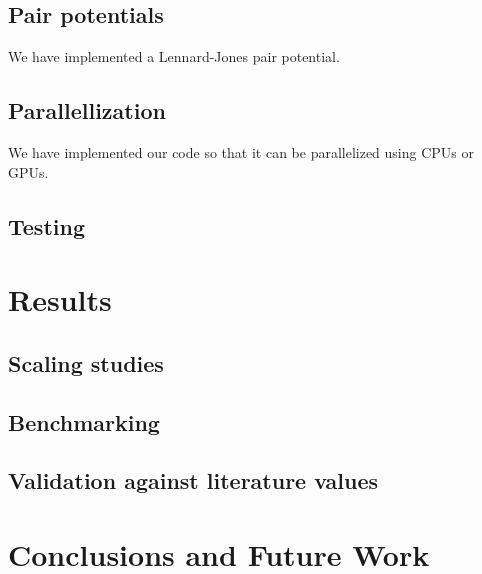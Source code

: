 \documentclass[12pt]{article}
\begin{document}
\subsection{Pair potentials}
We have implemented a Lennard-Jones pair potential.


\subsection{Parallellization}

We have implemented our code so that it can be parallelized using CPUs or GPUs.

\subsection{Testing}

\section{Results}

\subsection{Scaling studies}

\subsection{Benchmarking}

\subsection{Validation against literature values}

\section{Conclusions and Future Work}
\end{document}
